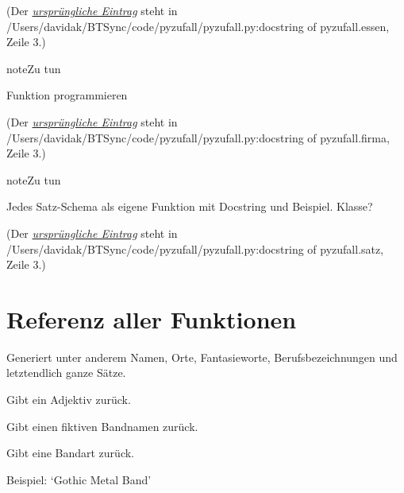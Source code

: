 \documentclass[a4paper,12pt,oneside]{sphinxmanual}
\begin{document}
(Der {\hyperref[funktionen:index-0]{\emph{ursprüngliche Eintrag}}} steht in /Users/davidak/BTSync/code/pyzufall/pyzufall.py:docstring of pyzufall.essen, Zeile 3.)

\begin{notice}{note}{Zu tun}

Funktion programmieren
\end{notice}

(Der {\hyperref[funktionen:index-1]{\emph{ursprüngliche Eintrag}}} steht in /Users/davidak/BTSync/code/pyzufall/pyzufall.py:docstring of pyzufall.firma, Zeile 3.)

\begin{notice}{note}{Zu tun}

Jedes Satz-Schema als eigene Funktion mit Docstring und Beispiel. Klasse?
\end{notice}

(Der {\hyperref[funktionen:index-2]{\emph{ursprüngliche Eintrag}}} steht in /Users/davidak/BTSync/code/pyzufall/pyzufall.py:docstring of pyzufall.satz, Zeile 3.)


\section{Referenz aller Funktionen}
\label{funktionen:referenz-aller-funktionen}\label{funktionen::doc}\label{funktionen:module-pyzufall}
Generiert unter anderem Namen, Orte, Fantasieworte, Berufsbezeichnungen und letztendlich ganze Sätze.

\begin{fulllineitems}
\label{funktionen:pyzufall.adj}
Gibt ein Adjektiv zurück.

\end{fulllineitems}


\begin{fulllineitems}
\label{funktionen:pyzufall.band}
Gibt einen fiktiven Bandnamen zurück.

\end{fulllineitems}


\begin{fulllineitems}
\label{funktionen:pyzufall.bandart}
Gibt eine Bandart zurück.

Beispiel: `Gothic Metal Band'

\end{fulllineitems}
\end{document}
